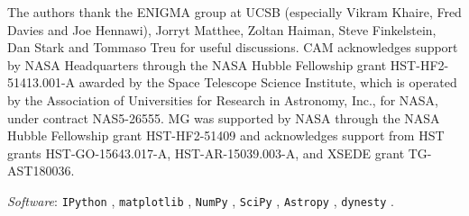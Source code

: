 \documentclass[fleqn,usenatbib]{mnras}
\begin{document}
The authors thank the ENIGMA group at UCSB (especially Vikram Khaire, Fred Davies and Joe Hennawi), Jorryt Matthee, Zoltan Haiman, Steve Finkelstein, Dan Stark and Tommaso Treu for useful discussions. CAM acknowledges support by NASA Headquarters through the NASA Hubble Fellowship grant HST-HF2-51413.001-A awarded by the Space Telescope Science Institute, which is operated by the Association of Universities for Research in Astronomy, Inc., for NASA, under contract NAS5-26555. MG was supported by NASA through the NASA Hubble Fellowship grant HST-HF2-51409 and acknowledges support from HST grants HST-GO-15643.017-A, HST-AR-15039.003-A, and XSEDE grant TG-AST180036.

\noindent
\textit{Software}: \verb|IPython| \citep{Perez2007a}, \verb|matplotlib| \citep{Hunter2007a}, \verb|NumPy| \citep{VanderWalt2011a}, \verb|SciPy| \citep{Oliphant2007a}, \verb|Astropy| \citep{Robitaille2013}, \verb|dynesty| \citep{Speagle2019}.







\bsp	%
\label{lastpage}
\end{document}
